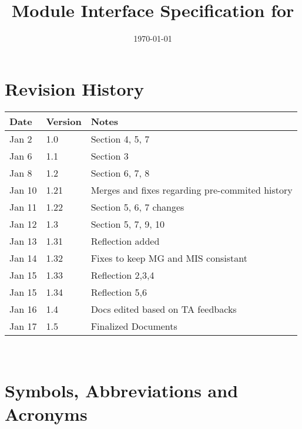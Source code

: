 \documentclass[12pt, titlepage]{article}
\begin{document}
\title{Module Interface Specification for \progname{}}

\author{\authname}

\date{\today}

\maketitle


\section{Revision History}

\begin{tabularx}{\textwidth}{p{3cm}p{2cm}X}
\toprule {\bf Date} & {\bf Version} & {\bf Notes}\\
\midrule
Jan 2 & 1.0 & Section 4, 5, 7\\
Jan 6 & 1.1 & Section 3\\
Jan 8 & 1.2 & Section 6, 7, 8\\
Jan 10 & 1.21 & Merges and fixes regarding pre-commited history\\
Jan 11 & 1.22 & Section 5, 6, 7 changes\\
Jan 12 & 1.3 & Section 5, 7, 9, 10\\
Jan 13 & 1.31 & Reflection added\\
Jan 14 & 1.32 & Fixes to keep MG and MIS consistant\\
Jan 15 & 1.33 & Reflection 2,3,4\\
Jan 15 & 1.34 & Reflection 5,6\\
Jan 16 & 1.4 & Docs edited based on TA feedbacks\\
Jan 17 & 1.5 & Finalized Documents\\
\bottomrule
\end{tabularx}

~\newpage

\section{Symbols, Abbreviations and Acronyms}
\end{document}
